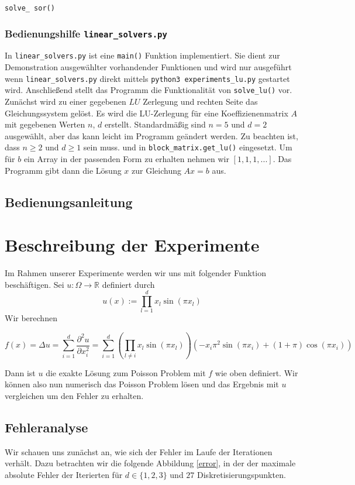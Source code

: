 \documentclass[smallheadings]{scrartcl}
\theoremstyle{definition}
\begin{document}
\texttt{solve\_ sor()}

\subsubsection*{Bedienungshilfe \texttt{linear\_solvers.py}}
In \texttt{linear\_solvers.py} ist eine \texttt{main()} Funktion implementiert. Sie dient zur Demonstration ausgewählter vorhandender Funktionen und
		wird nur ausgef\"uhrt wenn \texttt{linear\_solvers.py} direkt mittels \texttt{python3 experiments\_lu.py} gestartet wird. 
Anschließend stellt das Programm die Funktionalität von \texttt{solve\_lu()} vor. Zunächst wird zu einer gegebenen $LU$ Zerlegung und rechten Seite das Gleichungssystem gelöst.
Es wird die LU-Zerlegung für eine Koeffizienenmatrix $A$ mit gegebenen Werten $n$, $d$  erstellt. Standardmäßig sind $n=5$ und $d=2$ ausgewählt, aber das kann leicht im Programm geändert werden. Zu beachten ist, dass $n\geq 2$ und $d\geq 1$ sein muss. und in \texttt{block\_matrix.get\_lu()} eingesetzt. Um für $b$ ein Array in der passenden Form zu erhalten nehmen wir $[1,1,1,...]$.
Das Programm gibt dann die Lösung $x$ zur Gleichung $Ax=b$ aus.

\subsection*{Bedienungsanleitung }
\section{Beschreibung der Experimente}

 \cbstart Im Rahmen unserer Experimente werden wir uns mit folgender Funktion beschäftigen.
Sei $u:\Omega\rightarrow \mathbb{R}$ definiert durch
$$u(x):=\prod_{l=1}^dx_l\sin (\pi x_l)$$
Wir berechnen

$$f(x)=\Delta u= \sum_{i=1}^d\frac{\partial ^2 u}{\partial x_i^2}=
 \sum_{i=1}^d \left(\prod_{l\neq i}x_l\sin (\pi x_l)\right)\left(-x_i\pi ^2\sin (\pi x_i)+(1+\pi)\cos (\pi x_i) \right)$$

Dann ist $u$ die exakte Lösung zum Poisson Problem mit $f$ wie oben definiert. Wir können also nun numerisch das Poisson Problem lösen und das Ergebnis mit $u$ vergleichen um den Fehler zu erhalten. \cbend
\subsection{Fehleranalyse}
Wir schauen uns zunächst an, wie sich der Fehler im Laufe der Iterationen verhält. Dazu betrachten wir die folgende Abbildung \ref{error}, in der der maximale absolute Fehler der Iterierten für $d\in\{1,2,3\}$ und $27$ Diskretisierungspunkten.  
\end{document}
